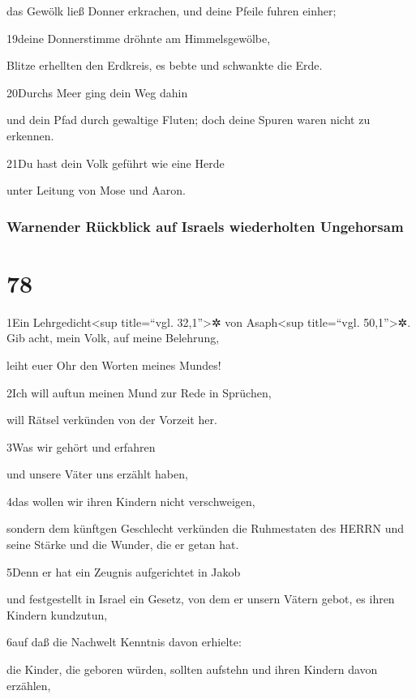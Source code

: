 das Gewölk ließ Donner erkrachen, und deine Pfeile fuhren einher;

19deine Donnerstimme dröhnte am Himmelsgewölbe,

Blitze erhellten den Erdkreis, es bebte und schwankte die Erde.

20Durchs Meer ging dein Weg dahin

und dein Pfad durch gewaltige Fluten; doch deine Spuren waren nicht zu
erkennen.

21Du hast dein Volk geführt wie eine Herde

unter Leitung von Mose und Aaron.

\hypertarget{warnender-ruxfcckblick-auf-israels-wiederholten-ungehorsam}{%
\subsubsection{Warnender Rückblick auf Israels wiederholten
Ungehorsam}\label{warnender-ruxfcckblick-auf-israels-wiederholten-ungehorsam}}

\hypertarget{section-77}{%
\section{78}\label{section-77}}

1Ein Lehrgedicht\textless sup title=``vgl. 32,1''\textgreater✲ von
Asaph\textless sup title=``vgl. 50,1''\textgreater✲. Gib acht, mein
Volk, auf meine Belehrung,

leiht euer Ohr den Worten meines Mundes!

2Ich will auftun meinen Mund zur Rede in Sprüchen,

will Rätsel verkünden von der Vorzeit her.

3Was wir gehört und erfahren

und unsere Väter uns erzählt haben,

4das wollen wir ihren Kindern nicht verschweigen,

sondern dem künftgen Geschlecht verkünden die Ruhmestaten des HERRN und
seine Stärke und die Wunder, die er getan hat.

5Denn er hat ein Zeugnis aufgerichtet in Jakob

und festgestellt in Israel ein Gesetz, von dem er unsern Vätern gebot,
es ihren Kindern kundzutun,

6auf daß die Nachwelt Kenntnis davon erhielte:

die Kinder, die geboren würden, sollten aufstehn und ihren Kindern davon
erzählen,


